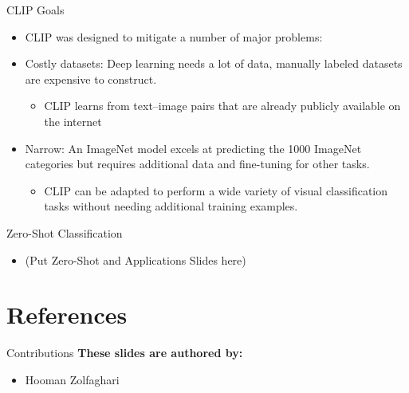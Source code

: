\documentclass[serif, aspectratio=169]{beamer}
\begin{document}
\begin{frame}{CLIP Goals}
\begin{itemize}
\item CLIP was designed to mitigate a number of major problems:
\item Costly datasets: Deep learning needs a lot of data, manually labeled datasets are expensive to construct.
\begin{itemize}
\item CLIP learns from text–image pairs that are already publicly available on the internet
\end{itemize}
\item Narrow: An ImageNet model excels at predicting the 1000 ImageNet categories but requires additional data and fine-tuning for other tasks. 

\begin{itemize}
\item CLIP can be adapted to perform a wide variety of visual classification tasks without needing additional training examples. 
\end{itemize}
\end{itemize}

\end{frame}


\begin{frame}{Zero-Shot Classification}
\begin{itemize}
\item (Put Zero-Shot and Applications Slides here)
\end{itemize}
\end{frame}

\section{References}

\begin{frame}{Contributions}
\textbf{These slides are authored by:}
    \begin{itemize}
        \item Hooman Zolfaghari
    \end{itemize}
    
\end{frame}


\begin{frame}[allowframebreaks]
   \nocite{*} %
\end{frame}
\end{document}
